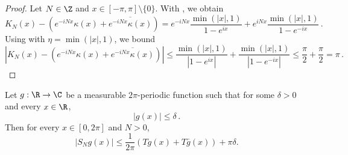 \begin{proof}
    \leanok
    Let $N\in\Z$ and $x\in [-\pi,\pi] \setminus \{0\}$. With , we obtain
    \begin{equation*}
        K_N(x) - (e^{-iNx}\kappa(x) + \overline{e^{-iNx}\kappa(x)})
        = e^{-iNx} \frac{\min(|x|, 1) }{1 - e^{ix}} + e^{iNx} \frac{\min(|x|, 1) }{1 - e^{-ix}} \,.
    \end{equation*}
    Using  with $\eta = \min(|x|, 1)$, we bound
    \begin{equation*}
        \left|K_N(x) - (e^{-iNx}\kappa(x) + \overline{e^{-iNx}\kappa(x)})\right|
        \le \frac{\min(|x|, 1) }{|1 - e^{ix}|} + \frac{\min(|x|, 1)}{|1 - e^{-ix}|}
        \le \frac{\pi}{2} + \frac{\pi}{2} = \pi \,.
    \end{equation*}
\end{proof}

\begin{lemma}
    \label{partial-Fourier-sum-bound}
    \leanok
    Let $g:\R\to\C$ be a measurable $2\pi$-periodic function such that for some $\delta>0$ and every $x\in\R$,
    \begin{equation}
        |g(x)|\le \delta \,.
    \end{equation}
    Then for every $x\in [0,2\pi]$ and $N>0$,
    \begin{equation*}
        |S_N g(x)| \le \frac{1}{2\pi} (Tg(x) + T\bar{g}(x)) + \pi\delta.
    \end{equation*}
\end{lemma}

